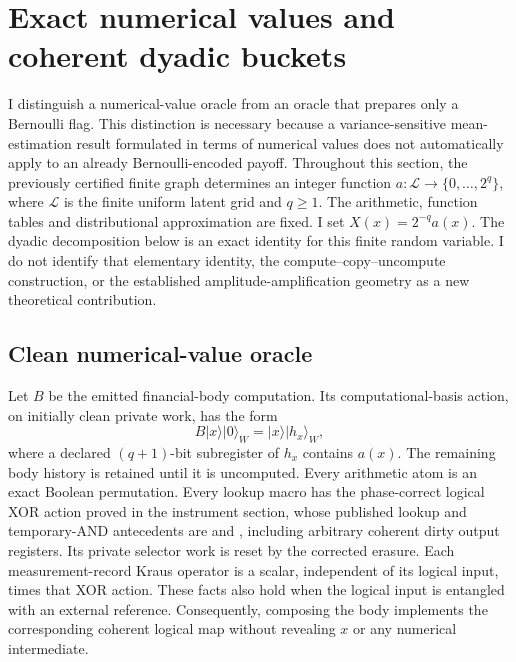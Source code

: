 \section{Exact numerical values and coherent dyadic buckets}

I distinguish a numerical-value oracle from an oracle that prepares only a
Bernoulli flag. This distinction is necessary because a variance-sensitive
mean-estimation result formulated in terms of numerical values does not
automatically apply to an already Bernoulli-encoded payoff. Throughout this
section, the previously certified finite graph determines an integer function
\(a:\mathcal L\longrightarrow\{0,\ldots,2^q\}\), where
\(\mathcal L\) is the finite uniform latent grid and \(q\geq1\).
The arithmetic, function tables and distributional approximation are fixed.
I set \(X(x)=2^{-q}a(x)\). The dyadic decomposition below is an exact
identity for this finite random variable. I do not identify that elementary
identity, the compute--copy--uncompute construction, or the established
amplitude-amplification geometry \citep{brassard} as a new theoretical
contribution.

\subsection{Clean numerical-value oracle}

Let \(B\) be the emitted financial-body computation. Its computational-basis
action, on initially clean private work, has the form
\[
 B\lvert x\rangle\lvert0\rangle_W
 =\lvert x\rangle\lvert h_x\rangle_W,
\]
where a declared \((q+1)\)-bit subregister of \(h_x\) contains \(a(x)\).
The remaining body history is retained until it is uncomputed. Every
arithmetic atom is an exact Boolean permutation. Every lookup macro has the
phase-correct logical XOR action proved in the instrument section, whose
published lookup and temporary-AND antecedents are
\citet{babbush} and \citet{gidney}, including
arbitrary coherent dirty output registers. Its private selector work is
reset by the corrected erasure. Each measurement-record Kraus operator is a
scalar, independent of its logical input, times that XOR action. These facts
also hold when the logical input is entangled with an external reference.
Consequently, composing the body implements the corresponding coherent
logical map without revealing \(x\) or any numerical intermediate.

